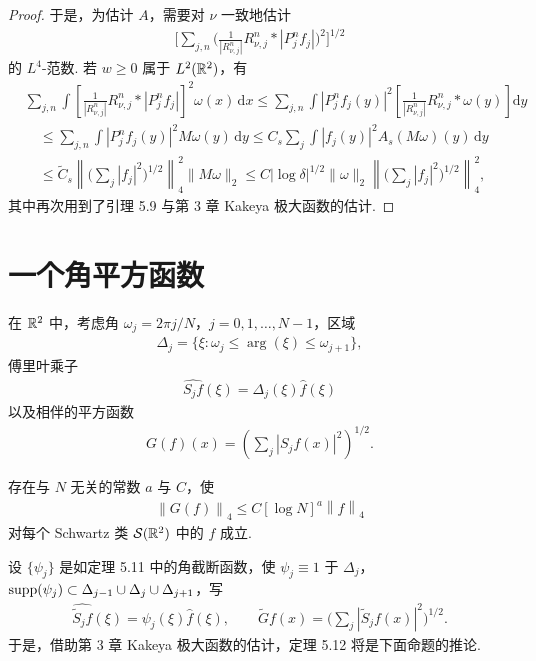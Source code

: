 \begin{proof}
于是，为估计 $A$，需要对 $\nu$ 一致地估计
\begin{align*}
  \Big[\sum_{j,n}\Big(\frac{1}{|R_{\nu,j}^{n}|}R_{\nu,j}^{n}*|P_{j}^{n}f_{j}|\Big)^{2}\Big]^{1/2}
\end{align*}
的 $L^{4}$-范数. 若 $w \geq 0$ 属于 $L^2(\mathbb{R}^2)$，有
\begin{align*}
  &\sum_{j,n}\int\left[\frac{1}{\left|R^{n}_{\nu,j}\right|}R^{n}_{\nu,j}*|P^{n}_{j} f_{j}|\right]^{2}\omega(x)\,\mathrm{d}x
  \leq\sum_{j,n}\int|P^{n}_{j} f_{j}(y)|^{2}\left[\frac{1}{\left|R^{n}_{\nu,j}\right|}R^{n}_{\nu,j}*\omega(y)\right]\mathrm{d}y\\
  &\quad\leq\sum_{j,n}\int|P^{n}_{j} f_{j}(y)|^{2}M\omega(y)\,\mathrm{d}y
  \leq C_{s}\sum_{j}\int|f_{j}(y)|^{2}A_{s}(M\omega)(y)\,\mathrm{d}y\\
  &\quad\leq\widetilde{C}_{s}\left\|\Big(\sum_{j}|f_{j}|^{2}\Big)^{1/2}\right\|_{4}^{2}\|M\omega\|_{2}
  \leq C\left|\log\delta\right|^{1/2}\|\omega\|_{2}\left\|\Big(\sum_{j}|f_{j}|^{2}\Big)^{1/2}\right\|_{4}^{2},
\end{align*}
其中再次用到了引理 5.9 与第 3 章 Kakeya 极大函数的估计.
\end{proof}

\section{一个角平方函数}

在 $\mathbb{R}^2$ 中，考虑角 $\omega_j = 2\pi j/N$，$j = 0,1,\ldots,N-1$，区域
\begin{align*}
  \Delta_{j}=\{\xi:\omega_{j}\leq\arg(\xi)\leq\omega_{j+1}\},
\end{align*}
傅里叶乘子
\begin{align*}
  \widehat{S_{j}f}(\xi)=\Delta_{j}(\xi)\widehat{f}(\xi)
\end{align*}
以及相伴的平方函数
\begin{align*}
  G(f)(x)=\left(\sum_{j}\left|S_{j}f(x)\right|^{2}\right)^{1/2}.
\end{align*}

\begin{theorem}\label{thm:5.12}
存在与 $N$ 无关的常数 $a$ 与 $C$，使
\begin{align*}
  \left\|G(f)\right\|_{4}\leq C\left[\log N\right]^{a}\left\|f\right\|_{4}
\end{align*}
对每个 Schwartz 类 $\mathcal{S}(\mathbb{R}^{2})$ 中的 $f$ 成立.
\end{theorem}

设 $\{\psi_j\}$ 是如定理 5.11 中的角截断函数，使 $\psi_j \equiv 1$ 于 $\Delta_j$，$\operatorname{supp}(\psi_j) \subset \Delta_{j-1} \cup \Delta_j \cup \Delta_{j+1}$，写
\begin{align*}
  \widehat{\widetilde{S}_{j}f}(\xi)=\psi_{j}(\xi)\widehat{f}(\xi),\qquad
  \widetilde{G}f(x)=\Big(\sum_{j}|\widetilde{S}_{j}f(x)|^{2}\Big)^{1/2}.
\end{align*}
于是，借助第 3 章 Kakeya 极大函数的估计，定理 5.12 将是下面命题的推论.

